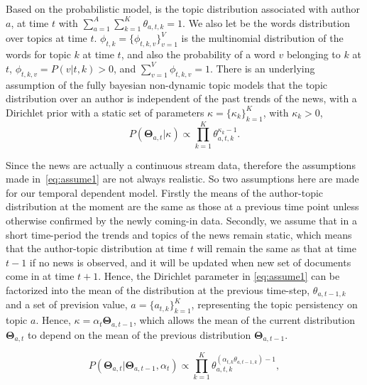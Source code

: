 Based on the probabilistic model, \thetadef is the topic distribution associated with author $a$, at time $t$ with  $\sum_{a=1}^A\sum_{k=1}^K\theta_{a, t, k}=1$. We also let \phidef be the words distribution over topics at time $t$. $\phi_{t, k}=\{\phi_{t, k, v}\}_{v=1}^V$ is the multinomial distribution of the words for topic $k$ at time $t$, and also the probability of a word $v$ belonging to $k$ at $t$, $\phi_{t, k, v}=P(v|t, k)>0$, and $\sum_{v=1}^V \phi_{t, k, v}=1$. There is an underlying assumption of the fully bayesian non-dynamic topic models that the topic distribution over an author is independent of the past trends of the news, with a Dirichlet prior with a static set of parameters $\kappa=\{\kappa_k\}_{k=1}^K$, with $\kappa_{k}>0$,
\begin{equation}
\label{eq:assume1}
P(\boldsymbol{\Theta}_{a,t} | \kappa)  \propto \prod_{k=1}^K \theta_{a, t, k}^{\kappa_k -1}.
\end{equation}

Since the news are actually a continuous stream data, therefore the assumptions made in~\eqref{eq:assume1} are not always realistic. So two assumptions here are made for our temporal dependent model. Firstly the means of the author-topic distribution at the moment are the same as those at a previous time point unless otherwise confirmed by the newly coming-in data. Secondly, we assume that in a short time-period the trends and topics of the news remain static, which means that the author-topic distribution at time $t$ will remain the same as that at time $t-1$ if no news is observed, and it will be updated when new set of documents come in at time $t+1$. Hence, the Dirichlet parameter in \eqref{eq:assume1} can be factorized into the mean of the distribution at the previous time-step, $\theta_{a,t-1,k}$ and a set of prevision value, $a = \{a_{t,k}\}_{k=1}^K$, representing the topic persistency on topic $a$. Hence, $\kappa=\alpha_t \boldsymbol{\Theta}_{a,t-1}$, which allows the mean of the current distribution $\boldsymbol{\Theta}_{a,t}$ to depend on the mean of the previous distribution $\boldsymbol{\Theta}_{a,t-1}$.

\begin{equation}
\label{eq:shortTheta}
P(\boldsymbol{\Theta}_{a,t} | \boldsymbol{\Theta}_{a,t-1}, \alpha_t) \propto \prod_{k=1}^K \theta_{a,t, k}^{(\alpha_{t, k} \theta_{a,t-1, k}) -1},
\end{equation}

